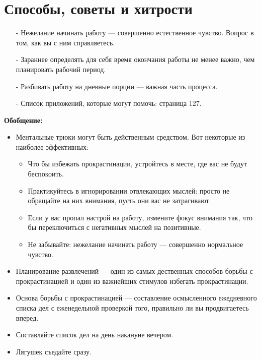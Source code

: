 \documentclass{article}
\begin{document}
\section{Способы, советы и хитрости}
\begin{itemize}
\item[-] Нежелание начинать работу --- совершенно естественное чувство. Вопрос в том, как вы с ним справляетесь.
\item[-] Зараннее определять для себя время окончания работы не менее важно, чем планировать рабочий период.
\item[-] Разбивать работу на дневные порции --- важная часть процесса.
\item[-] Список приложений, которые могут помочь: страница 127.
\end{itemize}
\textbf{Обобщение:}
\begin{itemize}
\item Ментальные трюки могут быть действенным средством. Вот некоторые из наиболее эффективных:
\begin{itemize}
\item Что бы избежать прокрастинации, устройтесь в месте, где вас не будут беспокоить.
\item Практикуйтесь в игнорировании отвлекающих мыслей: просто не обращайте на них внимания, пусть они вас не затрагивают.
\item Если у вас пропал настрой на работу, измените фокус внимания так, что бы переключиться с негативных мыслей на позитивные.
\item Не забывайте: нежелание начинать работу --- совершенно нормальное чувство.
\end{itemize}
\item Планирование развлечений --- один из самых дественных способов борьбы с прокрастинацией и один из важнейших стимулов избегать прокрастинации.
\item Основа борьбы с прокрастинацией --- составление осмысленного ежедневного списка дел с еженедельной проверкой того, правильно ли вы продвигаетесь вперед.
\item Составляйте список дел на день накануне вечером.
\item Лягушек съедайте сразу.
\end{itemize}
\end{document}
